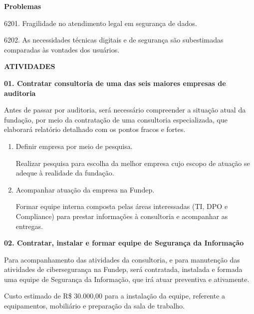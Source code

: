 \documentclass[12pt,a4paper]{article}
\newcommand{\secao}[1]{%
  \par\vspace{\dimexpr16pt-\parskip\relax}%
  {\noindent\bfseries\color{azulTitulo}\fontsize{13}{16}\selectfont #1}%
  \par\vspace{\dimexpr8pt-\parskip\relax}%
}
\newcommand{\atividade}[1]{%
  \par\vspace{\dimexpr16pt-\parskip\relax}%
  {\bfseries\color{azulAtividade}#1}%
  \par\vspace{\dimexpr8pt-\parskip\relax}%
}
\newcommand{\categoriafofa}[1]{%
  \par\vspace{\dimexpr8pt-\parskip\relax}%
  {\bfseries #1}%
  \par\vspace{\dimexpr4pt-\parskip\relax}%
}
\begin{document}
\categoriafofa{Problemas}

\begin{fofa}
  \item 6201. Fragilidade no atendimento legal em segurança de dados.
  \item 6202. As necessidades técnicas digitais e de segurança são subestimadas comparadas às vontades dos usuários.
\end{fofa}

%
\secao{ATIVIDADES}

\atividade{01. Contratar consultoria de uma das seis maiores empresas de auditoria}

Antes de passar por auditoria, será necessário compreender a situação atual da fundação, por meio da contratação de uma consultoria especializada, que elaborará relatório detalhado com os pontos fracos e fortes.

\begin{enumerate}
  \item Definir empresa por meio de pesquisa.

        Realizar pesquisa para escolha da melhor empresa cujo escopo de atuação se adeque à realidade da fundação.
  \item Acompanhar atuação da empresa na Fundep.

        Formar equipe interna composta pelas áreas interessadas (TI, DPO e Compliance) para prestar informações à consultoria e acompanhar as entregas.
\end{enumerate}

\atividade{02. Contratar, instalar e formar equipe de Segurança da Informação}

Para acompanhamento das atividades da consultoria, e para manutenção das atividades de cibersegurança na Fundep, será contratada, instalada e formada uma equipe de Segurança da Informação, que irá atuar preventiva e ativamente.

Custo estimado de R\$ 30.000,00 para a instalação da equipe, referente a equipamentos, mobiliário e preparação da sala de trabalho.
\end{document}
